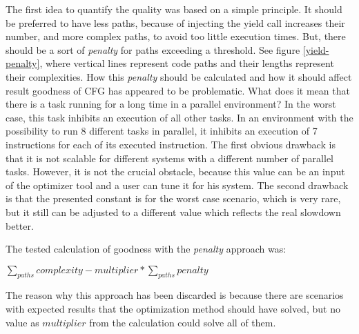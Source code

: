 The first idea to quantify the quality was based on a simple principle. It should be preferred to have less paths, because of injecting the yield call increases their number, and more complex paths, to avoid too little execution times. But, there should be a sort of \emph{penalty} for paths exceeding a threshold. See figure \ref{yield-penalty}, where vertical lines represent code paths and their lengths represent their complexities. How this \emph{penalty} should be calculated and how it should affect result goodness of CFG has appeared to be problematic. What does it mean that there is a task running for a long time in a parallel environment? In the worst case, this task inhibits an execution of all other tasks. In an environment with the possibility to run 8 different tasks in parallel, it inhibits an execution of 7 instructions for each of its executed instruction. The first obvious drawback is that it is not scalable for different systems with a different number of parallel tasks. However, it is not the crucial obstacle, because this value can be an input of the optimizer tool and a user can tune it for his system. The second drawback is that the presented constant is for the worst case scenario, which is very rare, but it still can be adjusted to a different value which reflects the real slowdown better.

The tested calculation of goodness with the \emph{penalty} approach was:

\begin{center}
$\sum_{paths}{complexity} - multiplier * \sum_{paths}{penalty}$
\end{center}

The reason why this approach has been discarded is because there are scenarios with expected results that the optimization method should have solved, but no value as $multiplier$ from the calculation could solve all of them.

